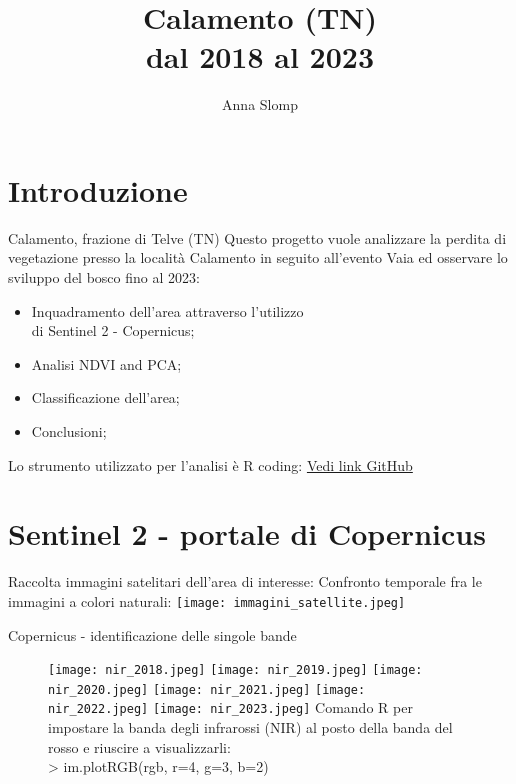 \documentclass[10pt]{beamer}
\title{Calamento (TN)\\
dal 2018 al 2023}
\author{Anna Slomp}
\begin{document}
\maketitle


\section{Introduzione}
\begin{frame}{Calamento, frazione di Telve (TN)}
Questo progetto vuole analizzare la perdita di vegetazione presso la località Calamento in seguito all'evento Vaia ed osservare lo sviluppo del bosco fino al 2023:
\begin{itemize}
    \item Inquadramento dell'area attraverso l'utilizzo\\
    di Sentinel 2 - Copernicus;
    \item Analisi NDVI and PCA; 
    \item Classificazione dell'area;
    \item Conclusioni;
\end{itemize}
Lo strumento utilizzato per l'analisi è R coding:
\href{https://github.com/DM001-1/telerilevamento_23_24/blob/main/R_script_exam.R}{Vedi link GitHub}
\end{frame}    

\section{Sentinel 2 - portale di Copernicus}
\begin{frame}{Raccolta immagini satelitari dell'area di interesse:}
Confronto temporale fra le immagini a colori naturali: 
\texttt{[image: immagini\_satellite.jpeg]}
\end{frame}

\begin{frame}{Copernicus - identificazione delle singole bande}
\begin{figure}
        \centering
        \texttt{[image: nir\_2018.jpeg]}
        \texttt{[image: nir\_2019.jpeg]} 
        \texttt{[image: nir\_2020.jpeg]}
        \texttt{[image: nir\_2021.jpeg]}
        \texttt{[image: nir\_2022.jpeg]} 
        \texttt{[image: nir\_2023.jpeg]}
Comando R per impostare la banda degli infrarossi (NIR) al posto della banda del rosso e riuscire a visualizzarli:\\ 
> im.plotRGB(rgb, r=4, g=3, b=2)
    \end{figure}
\end{frame}
\end{document}

